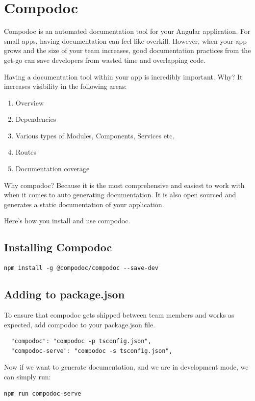 
\chapter{ Compodoc }
Compodoc is an automated documentation tool for your Angular application. For small apps, having documentation can feel like overkill. However, when your app grows and the size of your team increases, good documentation practices from the get-go can save developers from wasted time and overlapping code. 

Having a documentation tool within your app is incredibly important. Why? It increases visibility in the following areas:

\begin{enumerate}
  \item Overview 
  \item Dependencies
  \item Various types of Modules, Components, Services etc. 
  \item Routes
  \item Documentation coverage
\end{enumerate}

Why compodoc? Because it is the most comprehensive and easiest to work with when it comes to auto generating documentation. It is also open sourced and generates a static documentation of your application. 

Here's how you install and use compodoc.

\section{ Installing Compodoc }
\begin{verbatim}
npm install -g @compodoc/compodoc --save-dev
\end{verbatim}

\section{ Adding to package.json }
To ensure that compodoc gets shipped between team members and works as expected, add compodoc to your package.json file. 

\begin{verbatim}
  "compodoc": "compodoc -p tsconfig.json",
  "compodoc-serve": "compodoc -s tsconfig.json",
\end{verbatim}

Now if we want to generate documentation, and we are in development mode, we can simply run:
\begin{verbatim}
npm run compodoc-serve  
\end{verbatim}


